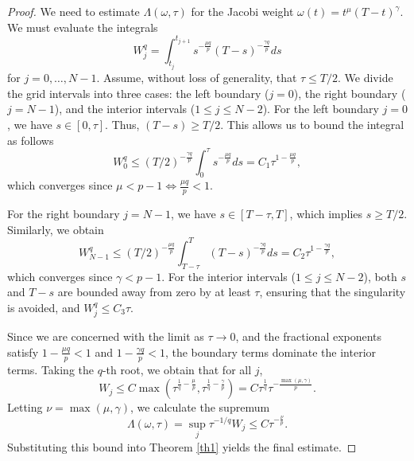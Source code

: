\documentclass[12pt,a4paper]{article}
\theoremstyle{definition}
\begin{document}
\begin{proof}
We need to estimate $\Lambda(\omega, \tau)$ for the Jacobi weight $\omega(t) = t^\mu(T-t)^\gamma$. We must evaluate the integrals 
\begin{equation}
    W_j^q = \int_{t_j}^{t_{j+1}} s^{-\frac{\mu q}{p}} (T-s)^{-\frac{\gamma q}{p}} ds
\end{equation}
for $j = 0, \dots, N-1$. Assume, without loss of generality, that $\tau \le T/2$. We divide the grid intervals into three cases: the left boundary ($j=0$), the right boundary ($j=N-1$), and the interior intervals ($1 \le j \le N-2$). For the left boundary $j=0$, we have $s \in [0, \tau]$. Thus, $(T-s) \ge T/2$. This allows us to bound the integral as follows
\begin{equation}
    W_0^q \le (T/2)^{-\frac{\gamma q}{p}} \int_0^\tau s^{-\frac{\mu q}{p}} ds = C_1 \tau^{1 - \frac{\mu q}{p}},
\end{equation}
which converges since $\mu < p-1 \iff \frac{\mu q}{p} < 1$.

For the right boundary $j=N-1$, we have $s \in [T-\tau, T]$, which implies $s \ge T/2$. Similarly, we obtain
\begin{equation}
    W_{N-1}^q \le (T/2)^{-\frac{\mu q}{p}} \int_{T-\tau}^T (T-s)^{-\frac{\gamma q}{p}} ds = C_2 \tau^{1 - \frac{\gamma q}{p}},
\end{equation}
which converges since $\gamma < p-1$. For the interior intervals ($1 \le j \le N-2$), both $s$ and $T-s$ are bounded away from zero by at least $\tau$, ensuring that the singularity is avoided, and $W_j^q \le C_3 \tau$. 

Since we are concerned with the limit as $\tau \to 0$, and the fractional exponents satisfy $1 - \frac{\mu q}{p} < 1$ and $1 - \frac{\gamma q}{p} < 1$, the boundary terms dominate the interior terms. Taking the $q$-th root, we obtain that for all $j$,
\begin{equation}
    W_j \le C \max\left( \tau^{\frac{1}{q} - \frac{\mu}{p}}, \tau^{\frac{1}{q} - \frac{\gamma}{p}} \right) = C \tau^{\frac{1}{q}} \tau^{-\frac{\max(\mu, \gamma)}{p}}.
\end{equation}
Letting $\nu = \max(\mu, \gamma)$, we calculate the supremum
\begin{equation}
    \Lambda(\omega, \tau) = \sup_j \tau^{-1/q} W_j \le C \tau^{-\frac{\nu}{p}}.
\end{equation}
Substituting this bound into Theorem \ref{th1} yields the final estimate.
\end{proof}
\end{document}
